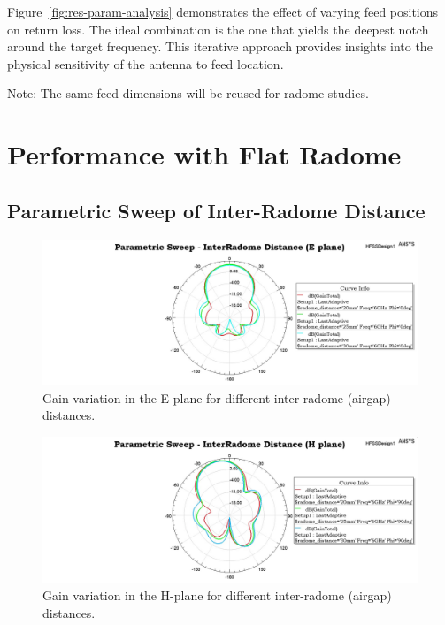 Figure~\ref{fig:res-param-analysis} demonstrates the effect of varying feed positions on return loss. The ideal combination is the one that yields the deepest notch around the target frequency. This iterative approach provides insights into the physical sensitivity of the antenna to feed location.

\noindent
Note: The same feed dimensions will be reused for radome studies.


\section{Performance with Flat Radome}

\subsection{Parametric Sweep of Inter-Radome Distance}

\begin{figure}[H]
    \centering
    \includegraphics[width=1.0\textwidth]{figures/parametric_sweep/Radome distance (E plane).jpeg}
    \caption{Gain variation in the E-plane for different inter-radome (airgap) distances.}
    \label{fig:res-gap-gain-eplane}
\end{figure}

\begin{figure}[H]
    \centering
    \includegraphics[width=1.0\textwidth]{figures/parametric_sweep/radome distance (H plane).jpeg}
    \caption{Gain variation in the H-plane for different inter-radome (airgap) distances.}
    \label{fig:res-gap-gain-hplane}
\end{figure}

